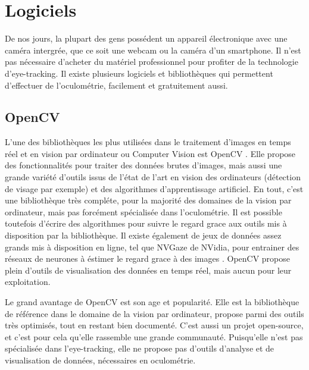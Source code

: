 \documentclass[12pt]{article}
\begin{document}

\section{Logiciels}

De nos jours, la plupart des gens possédent un appareil électronique avec une
caméra intergrée, que ce soit une webcam ou la caméra d'un smartphone. Il n'est
pas nécessaire d'acheter du matériel professionnel pour profiter de la
technologie d'eye-tracking. Il existe plusieurs logiciels et bibliothèques qui
permettent d'effectuer de l'oculométrie, facilement et gratuitement aussi.

\subsection{OpenCV}

L'une des bibliothèques les plus utilisées dans le traitement d'images en temps
réel et en vision par ordinateur ou Computer Vision est OpenCV \cite{opencv}.
Elle propose des fonctionnalités pour traiter des données brutes d'images, mais
aussi une grande variété d'outils issus de l'état de l'art en vision des
ordinateurs (détection de visage par exemple) et des algorithmes d'apprentissage
artificiel. En tout, c'est une bibliothèque très compléte, pour la majorité des
domaines de la vision par ordinateur, mais pas forcément spécialisée dans
l'oculométrie. Il est possible toutefois d'écrire des algorithmes pour suivre
le regard grace aux outils mis à disposition par la bibliothèque. Il existe
également de jeux de données assez grands mis à disposition en ligne, tel que
NVGaze \cite{nvgaze} de NVidia, pour entrainer des réseaux de neurones à
éstimer le regard grace à des images \cite{gaze_tracking}. OpenCV propose plein
d'outils de visualisation des données en temps réel, mais aucun pour leur
exploitation.

\bigskip
Le grand avantage de OpenCV est son age et popularité. Elle est la bibliothèque
de référence dans le domaine de la vision par ordinateur, propose parmi des
outils très optimisés, tout en restant bien documenté. C'est aussi un projet
open-source, et c'est pour cela qu'elle rassemble une grande communauté.
Puisqu'elle n'est pas spécialisée dans l'eye-tracking, elle ne propose pas
d'outils d'analyse et de visualisation de données, nécessaires en oculométrie.
\end{document}
